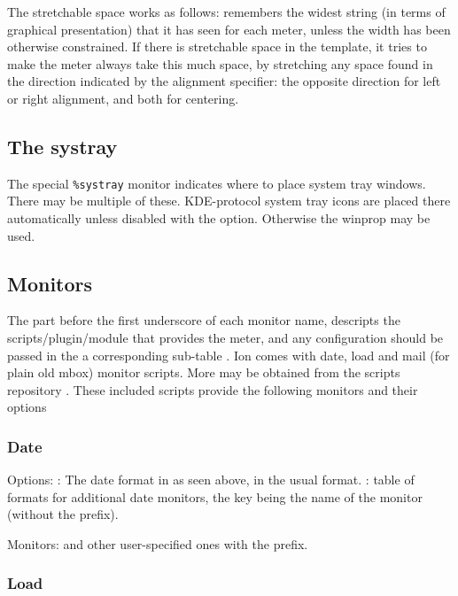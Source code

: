 The stretchable space works as follows:  remembers
the widest string (in terms of graphical presentation) that it has
seen for each meter, unless the width has been otherwise constrained.
If there is stretchable space in the template, it tries to make the
meter always take this much space, by stretching any space found in
the direction indicated by the alignment specifier: the opposite
direction for left or right alignment, and both for centering.

\subsection{The systray}

The special \verb!%systray! monitor indicates where to place system
tray windows. There may be multiple of these. KDE-protocol system tray
icons are placed there automatically unless disabled with the
 option. Otherwise the  winprop may
be used.

\subsection{Monitors}

The part before the first
underscore of each monitor name, descripts the scripts/plugin/module
that provides the meter, and any configuration should be passed
in the a corresponding sub-table .
Ion comes with date, load and mail (for plain old mbox) 
 monitor scripts. More may be obtained from 
the scripts repository \cite{scripts}. These included scripts 
provide the following monitors and their options

\subsubsection{Date}

Options: : The date format in as seen above, 
in the usual  format. : table of
formats for additional date monitors, the key being the name
of the monitor (without the  prefix).

Monitors:  and other user-specified ones with the
 prefix.


\subsubsection{Load}

